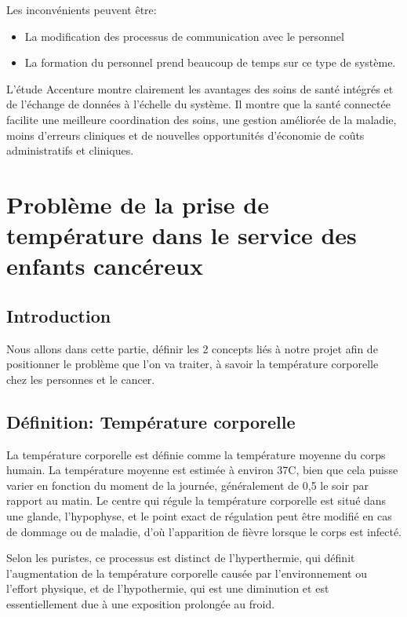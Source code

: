 \documentclass[12pt]{article}
\begin{document}
Les inconvénients peuvent être:
\begin{itemize}
	\item La modification des processus de communication avec le personnel
	\item La formation du personnel prend beaucoup de temps sur ce type de système.\\
\end{itemize}

L'étude Accenture \cite{28} montre clairement les avantages des soins de santé intégrés et de l'échange de données à l'échelle du système. Il montre que la santé connectée facilite une meilleure coordination des soins, une gestion améliorée de la maladie, moins d'erreurs cliniques et de nouvelles opportunités d'économie de coûts administratifs et cliniques.

\newpage
\section{Problème de la prise de température dans le service des enfants cancéreux}

\subsection{Introduction}
Nous allons dans cette partie, définir les 2 concepts liés à notre projet afin de positionner le problème que l’on va traiter, à savoir la température corporelle chez les personnes et le cancer.

\subsection{Définition: Température corporelle}
La température corporelle est définie comme la température moyenne du corps humain. La température moyenne est estimée à environ 37\textdegree{}C, bien que cela puisse varier en fonction du moment de la journée, généralement de 0,5 le soir par rapport au matin. Le centre qui régule la température corporelle est situé dans une glande, l'hypophyse, et le point exact de régulation peut être modifié en cas de dommage ou de maladie, d'où l'apparition de fièvre lorsque le corps est infecté. 

Selon les puristes, ce processus est distinct de l'hyperthermie, qui définit l'augmentation de la température corporelle causée par l'environnement ou l'effort physique, et de l'hypothermie, qui est une diminution et est essentiellement due à une exposition prolongée au froid. 
\end{document}
